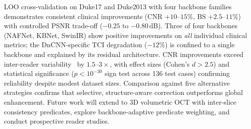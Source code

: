 \documentclass[journal,twoside,web]{ieeecolor}
\begin{document}
LOO cross-validation on Duke17 and Duke2013 with four backbone families demonstrates consistent clinical improvements (CNR $+10$--$15\%$, BS $+2.5$--$11\%$) with controlled PSNR trade-off ($-0.25$ to $-0.80$\,dB). Three of four backbones (NAFNet, KBNet, SwinIR) show positive improvements on \emph{all} individual clinical metrics; the DnCNN-specific TCI degradation ($-12\%$) is confined to a single backbone and explained by its residual architecture. CNR improvements exceed inter-reader variability~\cite{stein2006quality} by $1.5$--$3{\times}$, with effect sizes (Cohen's $d > 2.5$) and statistical significance ($p < 10^{-30}$ sign test across 136 test cases) confirming reliability despite modest dataset sizes. Comparison against five alternative strategies confirms that selective, structure-aware correction outperforms global enhancement. Future work will extend to 3D volumetric OCT with inter-slice consistency predicates, explore backbone-adaptive predicate weighting, and conduct prospective reader studies.
\end{document}
